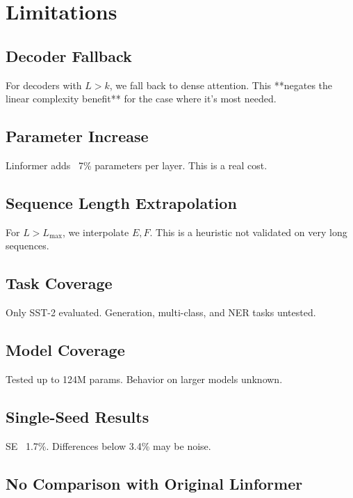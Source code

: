 \section{Limitations}

\subsection{Decoder Fallback}

For decoders with $L > k$, we fall back to dense attention. This **negates 
the linear complexity benefit** for the case where it's most needed.

\subsection{Parameter Increase}

Linformer adds ~7\% parameters per layer. This is a real cost.

\subsection{Sequence Length Extrapolation}

For $L > L_\text{max}$, we interpolate $E, F$. This is a heuristic not 
validated on very long sequences.

\subsection{Task Coverage}

Only SST-2 evaluated. Generation, multi-class, and NER tasks untested.

\subsection{Model Coverage}

Tested up to 124M params. Behavior on larger models unknown.

\subsection{Single-Seed Results}

SE ~1.7\%. Differences below 3.4\% may be noise.

\subsection{No Comparison with Original Linformer}

